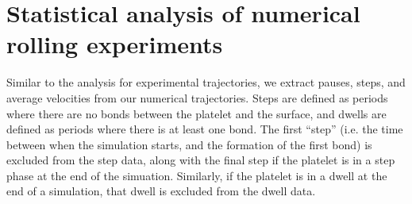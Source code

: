 \section{Statistical analysis of numerical rolling experiments}
\label{sec:stat-analys-numer}


Similar to the analysis for experimental trajectories, we extract
pauses, steps, and average velocities from our numerical
trajectories. Steps are defined as periods where there are no bonds
between the platelet and the surface, and dwells are defined as
periods where there is at least one bond. The first ``step'' (i.e. the
time between when the simulation starts, and the formation of the
first bond) is excluded from the step data, along with the final step
if the platelet is in a step phase at the end of the
simuation. Similarly, if the platelet is in a dwell at the end of a
simulation, that dwell is excluded from the dwell data.




